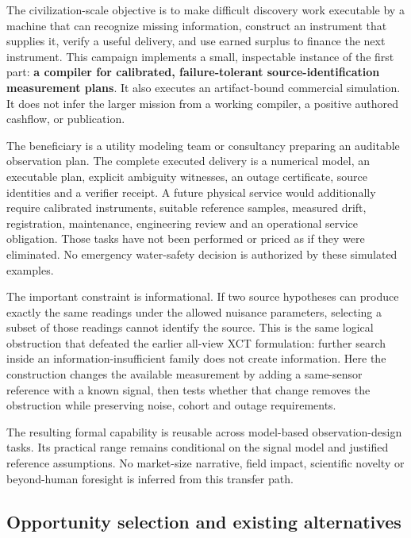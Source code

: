 \documentclass[
  11pt,
]{article}
\begin{document}
The civilization-scale objective is to make difficult discovery work
executable by a machine that can recognize missing information,
construct an instrument that supplies it, verify a useful delivery, and
use earned surplus to finance the next instrument. This campaign
implements a small, inspectable instance of the first part: \textbf{a
compiler for calibrated, failure-tolerant source-identification
measurement plans}. It also executes an artifact-bound commercial
simulation. It does not infer the larger mission from a working
compiler, a positive authored cashflow, or publication.

The beneficiary is a utility modeling team or consultancy preparing an
auditable observation plan. The complete executed delivery is a
numerical model, an executable plan, explicit ambiguity witnesses, an
outage certificate, source identities and a verifier receipt. A future
physical service would additionally require calibrated instruments,
suitable reference samples, measured drift, registration, maintenance,
engineering review and an operational service obligation. Those tasks
have not been performed or priced as if they were eliminated. No
emergency water-safety decision is authorized by these simulated
examples.

The important constraint is informational. If two source hypotheses can
produce exactly the same readings under the allowed nuisance parameters,
selecting a subset of those readings cannot identify the source. This is
the same logical obstruction that defeated the earlier all-view XCT
formulation: further search inside an information-insufficient family
does not create information. Here the construction changes the available
measurement by adding a same-sensor reference with a known signal, then
tests whether that change removes the obstruction while preserving
noise, cohort and outage requirements.

The resulting formal capability is reusable across model-based
observation-design tasks. Its practical range remains conditional on the
signal model and justified reference assumptions. No market-size
narrative, field impact, scientific novelty or beyond-human foresight is
inferred from this transfer path.

\hypertarget{opportunity-selection-and-existing-alternatives}{%
\subsection{Opportunity selection and existing
alternatives}\label{opportunity-selection-and-existing-alternatives}}
\end{document}

